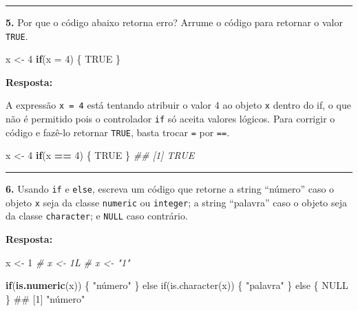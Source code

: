 \documentclass[]{book}
\newenvironment{Shaded}{\begin{snugshade}}{\end{snugshade}}
\newcommand{\CommentTok}[1]{\textcolor[rgb]{0.56,0.35,0.01}{\textit{#1}}}
\newcommand{\ControlFlowTok}[1]{\textcolor[rgb]{0.13,0.29,0.53}{\textbf{#1}}}
\newcommand{\DataTypeTok}[1]{\textcolor[rgb]{0.13,0.29,0.53}{#1}}
\newcommand{\DecValTok}[1]{\textcolor[rgb]{0.00,0.00,0.81}{#1}}
\newcommand{\KeywordTok}[1]{\textcolor[rgb]{0.13,0.29,0.53}{\textbf{#1}}}
\newcommand{\NormalTok}[1]{#1}
\newcommand{\OperatorTok}[1]{\textcolor[rgb]{0.81,0.36,0.00}{\textbf{#1}}}
\newcommand{\OtherTok}[1]{\textcolor[rgb]{0.56,0.35,0.01}{#1}}
\newcommand{\StringTok}[1]{\textcolor[rgb]{0.31,0.60,0.02}{#1}}
\begin{document}
\begin{center}\rule{0.5\linewidth}{0.5pt}\end{center}

\textbf{5.} Por que o código abaixo retorna erro? Arrume o código para retornar o valor \texttt{TRUE}.

\begin{Shaded}
\begin{Highlighting}[]
\NormalTok{x <-}\StringTok{ }\DecValTok{4}
\ControlFlowTok{if}\NormalTok{(}\DataTypeTok{x =} \DecValTok{4}\NormalTok{) \{}
  \OtherTok{TRUE}
\NormalTok{\}}
\end{Highlighting}
\end{Shaded}

\textbf{Resposta:}

A expressão \texttt{x\ =\ 4} está tentando atribuir o valor 4 ao objeto \texttt{x} dentro do if, o que não é permitido pois o controlador \texttt{if} só aceita valores lógicos. Para corrigir o código e fazê-lo retornar \texttt{TRUE}, basta trocar \texttt{=} por \texttt{==}.

\begin{Shaded}
\begin{Highlighting}[]
\NormalTok{x <-}\StringTok{ }\DecValTok{4}
\ControlFlowTok{if}\NormalTok{(x }\OperatorTok{==}\StringTok{ }\DecValTok{4}\NormalTok{) \{}
  \OtherTok{TRUE}
\NormalTok{\}}
\CommentTok{## [1] TRUE}
\end{Highlighting}
\end{Shaded}

\begin{center}\rule{0.5\linewidth}{0.5pt}\end{center}

\textbf{6.} Usando \texttt{if} e \texttt{else}, escreva um código que retorne a string ``número'' caso o objeto \texttt{x} seja da classe \texttt{numeric} ou \texttt{integer}; a string ``palavra'' caso o objeto seja da classe \texttt{character}; e \texttt{NULL} caso contrário.

\textbf{Resposta:}

\begin{Shaded}
\begin{Highlighting}[]
\NormalTok{x <-}\StringTok{ }\DecValTok{1}
\CommentTok{# x <- 1L}
\CommentTok{# x <- "1"}

\ControlFlowTok{if}\NormalTok{(}\KeywordTok{is.numeric}\NormalTok{(x)) \{}
  \StringTok{"número"}
\StringTok{\} else if(is.character(x)) \{}
\StringTok{  "}\NormalTok{palavra}\StringTok{"}
\StringTok{\} else \{ }
\StringTok{  NULL}
\StringTok{\}}
\StringTok{## [1] "}\NormalTok{número"}
\end{Highlighting}
\end{Shaded}
\end{document}
